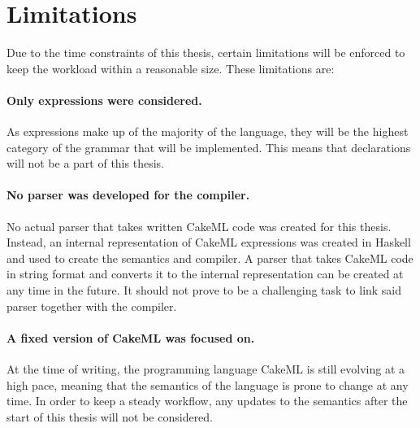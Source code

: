 \section{Limitations}
Due to the time constraints of this thesis, certain limitations will be enforced
to keep the workload within a reasonable size. These limitations are:

\paragraph{Only expressions were considered.}
As expressions make up of the majority of the language, they will be the highest
category of the grammar that will be implemented. This means that declarations
will not be a part of this thesis.

\paragraph{No parser was developed for the compiler.}
No actual parser that takes written CakeML code was created for this thesis.
Instead, an internal representation of CakeML expressions was created in
Haskell and used to create the semantics and compiler. A parser that
takes CakeML code in string format and converts it to the internal
representation can be created at any time in the future. It should not prove to
be a challenging task to link said parser together with the compiler.

\paragraph{A fixed version of CakeML was focused on.}
At the time of writing, the programming language CakeML is still evolving at a
high pace, meaning that the semantics of the language is prone to change at
any time. In order to keep a steady workflow, any updates to the semantics after
the start of this thesis will not be considered.

